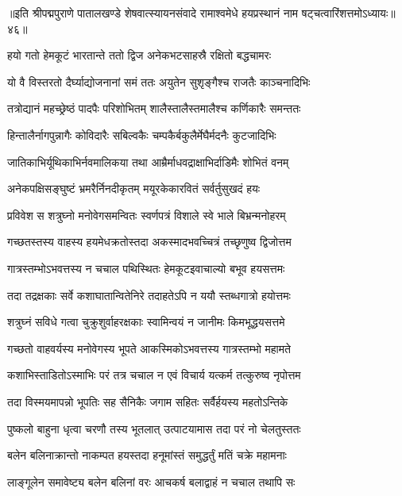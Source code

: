 {॥इति श्रीपद्मपुराणे पातालखण्डे शेषवात्स्यायनसंवादे रामाश्वमेधे हयप्रस्थानं नाम षट्चत्वारिंशत्तमोऽध्यायः॥४६॥}



\twolineshloka
{हयो गतो हेमकूटं भारतान्ते ततो द्विज}
{अनेकभटसाहस्रै रक्षितो बद्धचामरः}%

\twolineshloka
{यो वै विस्तरतो दैर्घ्याद्योजनानां समं ततः}
{अयुतेन सुशृङ्गैश्च राजतैः काञ्चनादिभिः}%

\twolineshloka
{तत्रोद्यानं महच्छ्रेष्ठं पादपैः परिशोभितम्}
{शालैस्तालैस्तमालैश्च कर्णिकारैः समन्ततः}%

\twolineshloka
{हिन्तालैर्नागपुन्नागैः कोविदारैः सबिल्वकैः}
{चम्पकैर्बकुलैर्मेघैर्मदनैः कुटजादिभिः}%

\twolineshloka
{जातिकाभिर्यूथिकाभिर्नवमालिकया तथा}
{आम्रैर्माधवद्राक्षाभिर्दाडिमैः शोभितं वनम्}%

\twolineshloka
{अनेकपक्षिसङ्घुष्टं भ्रमरैर्निनदीकृतम्}
{मयूरकेकारवितं सर्वर्तुसुखदं हयः}%

\twolineshloka
{प्रविवेश स शत्रुघ्नो मनोवेगसमन्वितः}
{स्वर्णपत्रं विशाले स्वे भाले बिभ्रन्मनोहरम्}%

\twolineshloka
{गच्छतस्तस्य वाहस्य हयमेधक्रतोस्तदा}
{अकस्मादभवच्चित्रं तच्छृणुष्व द्विजोत्तम}%

\twolineshloka
{गात्रस्तम्भोऽभवत्तस्य न चचाल पथिस्थितः}
{हेमकूटइवाचाल्यो बभूव हयसत्तमः}%

\twolineshloka
{तदा तद्रक्षकाः सर्वे कशाघातान्वितेनिरे}
{तदाहतेऽपि न ययौ स्तब्धगात्रो हयोत्तमः}%

\twolineshloka
{शत्रुघ्नं सविधे गत्वा चुक्रुशुर्वाहरक्षकाः}
{स्वामिन्वयं न जानीमः किमभूद्धयसत्तमे}%

\twolineshloka
{गच्छतो वाहवर्यस्य मनोवेगस्य भूपते}
{आकस्मिकोऽभवत्तस्य गात्रस्तम्भो महामते}%

\twolineshloka
{कशाभिस्ताडितोऽस्माभिः परं तत्र चचाल न}
{एवं विचार्य यत्कर्म तत्कुरुष्व नृपोत्तम}%

\twolineshloka
{तदा विस्मयमापन्नो भूपतिः सह सैनिकैः}
{जगाम सहितः सर्वैर्हयस्य महतोऽन्तिके}%

\twolineshloka
{पुष्कलो बाहुना धृत्वा चरणौ तस्य भूतलात्}
{उत्पाटयामास तदा परं नो चेलतुस्ततः}%

\twolineshloka
{बलेन बलिनाक्रान्तो नाकम्पत हयस्तदा}
{हनूमांस्तं समुद्धर्तुं मतिं चक्रे महामनाः}%

\twolineshloka
{लाङ्गूलेन समावेष्ट्य बलेन बलिनां वरः}
{आचकर्ष बलाद्वाहं न चचाल तथापि सः}%

